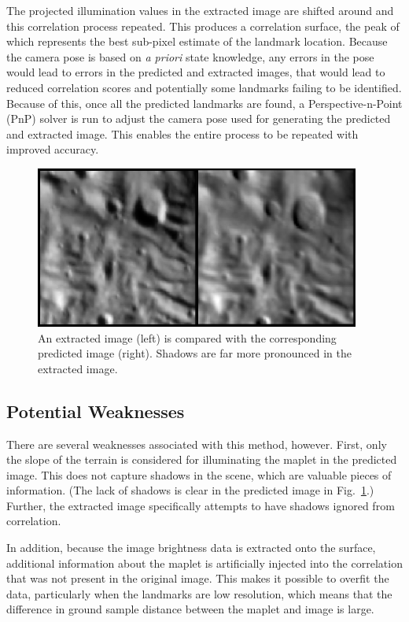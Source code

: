 \documentclass{RPI-SIW}
\begin{document}
The projected illumination values in the extracted image are shifted around and this correlation process repeated.  This produces a correlation surface, the peak of which represents the best sub-pixel estimate of the landmark location.  Because the camera pose is based on \textit{a priori} state knowledge, any errors in the pose would lead to errors in the predicted and extracted images, that would lead to reduced correlation scores and potentially some landmarks failing to be identified.  Because of this, once all the predicted landmarks are found, a Perspective-n-Point (PnP) solver is run to adjust the camera pose used for generating the predicted and extracted image.  This enables the entire process to be repeated with improved accuracy.\cite{opnav_near_sb}

\begin{figure}[h]
	\centering
	\includegraphics[width=\columnwidth]{spc_sample.png}
	\caption{An extracted image (left) is compared with the corresponding predicted image (right).  Shadows are far more pronounced in the extracted image.}
	\label{figs::sample}
\end{figure}

\subsection*{Potential Weaknesses}
There are several weaknesses associated with this method, however.  First, only the slope of the terrain is considered for illuminating the maplet in the predicted image.  This does not capture shadows in the scene, which are valuable pieces of information.  (The lack of shadows is clear in the predicted image in Fig.~\ref{figs::sample}.)  Further, the extracted image specifically attempts to have shadows ignored from correlation.

In addition, because the image brightness data is extracted onto the surface, additional information about the maplet is artificially injected into the correlation that was not present in the original image.  This makes it possible to overfit the data, particularly when the landmarks are low resolution, which means that the difference in ground sample distance between the maplet and image is large.
\end{document}

